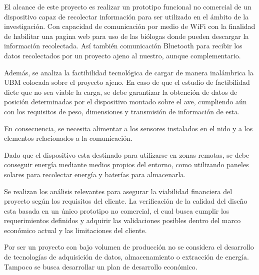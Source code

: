 El alcance de este proyecto es realizar un prototipo funcional no comercial de un dispositivo capaz de recolectar información para ser utilizado en el ámbito de la investigación. Con capacidad de  comunicación por medio de WiFi con la finalidad de habilitar una pagina web para uso de las biólogas donde pueden descargar la información recolectada. Así también comunicación Bluetooth para recibir los datos recolectados por un proyecto ajeno al nuestro, aunque complementario.

Además, se analiza la factibilidad tecnológica de cargar de manera inalámbrica la UBM colocada sobre el proyecto ajeno. En caso de que el estudio de factibilidad dicte que no sea viable la carga, se debe garantizar la obtención de datos de posición determinadas por el dispositivo montado sobre el ave, cumpliendo aún con los requisitos de peso, dimensiones y transmisión de información de esta.

En consecuencia, se necesita alimentar a los sensores instalados en el nido y a los elementos relacionados a la comunicación.

Dado que el dispositivo esta destinado para utilizarse en zonas remotas, se debe conseguir energía mediante medios propios del entorno, como utilizando paneles solares para recolectar energía y baterías para almacenarla.

Se realizan los análisis relevantes para asegurar la viabilidad financiera del proyecto según los requisitos del cliente. La verificación de la calidad del diseño esta basada en un único prototipo no comercial, el cual busca cumplir los requerimientos definidos y adquirir las validaciones posibles dentro del marco económico actual y las limitaciones del cliente. 

Por ser un proyecto con bajo volumen de producción no se considera el desarrollo de tecnologías de adquisición de datos, almacenamiento o extracción de energía. Tampoco se busca desarrollar un plan de desarrollo económico.